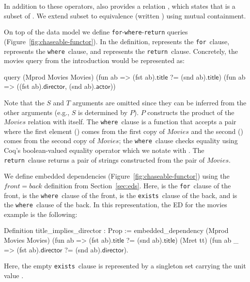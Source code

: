 \documentclass[preprint]{sigplanconf}
\newcommand{\FOR}{{\tt for}\relax\ifmmode\ \else\xspace\fi}
\newcommand{\EXISTS}{{\tt exists}\relax\ifmmode\ \else\xspace\fi}
\newcommand{\WHERE}{{\tt where}\relax\ifmmode\ \else\xspace\fi}
\newcommand{\RETURN}{{\tt return}\relax\ifmmode\ \else\xspace\fi}
\newcommand{\relation}[1]{\ensuremath{\mathit{#1}}\xspace}
\begin{document}
In addition to these operators,  also provides a relation , which states that  is a subset of .
We extend subset to equivalence (written ) using mutual containment.


On top of the data model we define {\tt for}-{\tt where}-{\tt return} queries (Figure~\ref{fig:chaseable-functor}).
In the definition,  represents the \FOR clause,  represents the \WHERE clause, and  represents the \RETURN clause.
Concretely, the movies query from the introduction would be represented as:
\begin{coq}
query (Mprod Movies Movies)
      (fun ab => (fst ab).$\textsf{title}$ ?= (snd ab).$\textsf{title}$)
      (fun ab => ((fst ab).$\textsf{director}$, (snd ab).$\textsf{actor}$))
\end{coq}
Note that the $S$ and $T$ arguments are omitted since they can be inferred from the other arguments (e.g., $S$ is determined by $P$).  $P$ constructs the product of the \relation{Movies} relation with itself.
The \WHERE clause is a function that accepts a pair where the first element () comes from the first copy of \relation{Movies} and the second () comes from the second copy of \relation{Movies}; the \WHERE clause checks equality using Coq's boolean-valued equality operator which we notate with .  The \RETURN clause returns a pair of strings constructed from the pair of \relation{Movies}.


We define embedded dependencies (Figure~\ref{fig:chaseable-functor}) using the $front = back$ definition from Section~\ref{sec:eds}.
Here,  is the \FOR clause of the front,  is the \WHERE clause of the front,  is the \EXISTS clause of the back, and  is the \WHERE clause of the back.
In this representation, the ED for the movies example is the following:
\begin{coq}
Definition title_implies_director : Prop :=
  embedded_dependency
    (Mprod Movies Movies)
    (fun ab => (fst ab).$\textsf{title}$ ?= (snd ab).$\textsf{title}$)
    (Mret tt)
    (fun ab _ => (fst ab).$\textsf{director}$ ?= (snd ab).$\textsf{director}$).
\end{coq}
Here, the empty \EXISTS clause is represented by a singleton set carrying the unit value .
\end{document}
